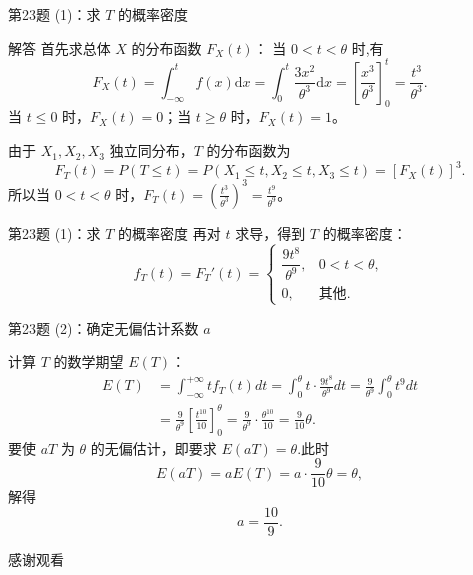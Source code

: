 \documentclass[aspectratio=169]{beamer}
\begin{document}
\begin{frame}{第23题 (1)：求 \(T\) 的概率密度}
\begin{block}{解答}
首先求总体 \(X\) 的分布函数 \(F_X(t)\)：
当 \(0 < t < \theta\) 时,有
\[
F_X(t) = \int_{-\infty}^{t} f(x) \mathrm{d}x = \int_{0}^{t} \frac{3x^2}{\theta^3} \mathrm{d}x = \left[ \frac{x^3}{\theta^3} \right]_0^t = \frac{t^3}{\theta^3}.
\]
当 \(t \le 0\) 时，\(F_X(t)=0\)；当 \(t \ge \theta\) 时，\(F_X(t)=1\)。

由于 \(X_1, X_2, X_3\) 独立同分布，\(T\) 的分布函数为
\[
F_T(t) = P(T \le t) = P(X_1 \le t, X_2 \le t, X_3 \le t) = [F_X(t)]^3.
\]
所以当 \(0 < t < \theta\) 时，\(F_T(t)=\left( \frac{t^3}{\theta ^3} \right) ^3=\frac{t^9}{\theta ^9}\)。
\end{block}
\end{frame}

\begin{frame}{第23题 (1)：求 \(T\) 的概率密度}
再对 \(t\) 求导，得到 \(T\) 的概率密度：
\[
f_T(t) = F_T'(t) = \begin{cases} \dfrac{9 t^{8}}{\theta^{9}}, & 0<t<\theta, \\ 0, & \text{其他}. \end{cases}
\]
\end{frame}

\begin{frame}{第23题 (2)：确定无偏估计系数 \(a\)}
\begin{block}{}
计算 \(T\) 的数学期望 \(E(T)\)：
\begin{align*}
E(T) &= \int_{-\infty}^{+\infty} t f_T(t) dt = \int_{0}^{\theta} t \cdot \frac{9 t^8}{\theta^9} dt = \frac{9}{\theta^9} \int_{0}^{\theta} t^9 dt
\\
&= \frac{9}{\theta^9} \left[ \frac{t^{10}}{10} \right]_0^\theta = \frac{9}{\theta^9} \cdot \frac{\theta^{10}}{10} = \frac{9}{10}\theta.
\end{align*}
要使 \(aT\) 为 \(\theta\) 的无偏估计，即要求 \(E(aT) = \theta\).此时
\[
E(aT) = a E(T) = a \cdot \frac{9}{10}\theta = \theta,
\]
解得
\[
a = \frac{10}{9}.
\]
\end{block}
\end{frame}

\begin{frame}
\centering
\vfill
\Huge \textcolor{mycolor}{感谢观看} \\
\vfill
\end{frame}
\end{document}

